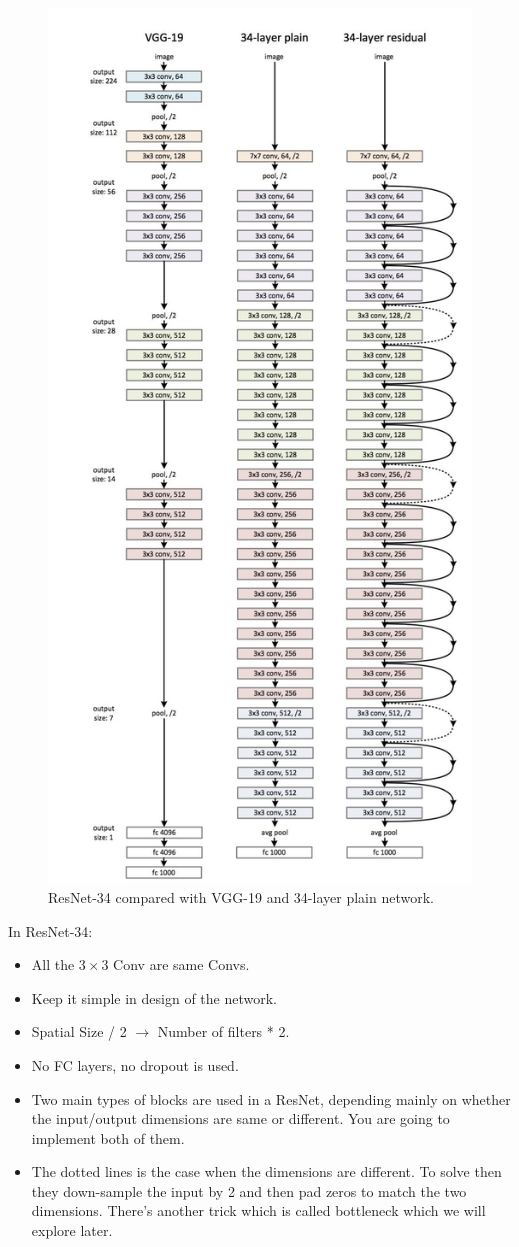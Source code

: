 \begin{figure}[!htbp]
    \centering
    \includegraphics[width=1.0\textwidth, height=1.3\textwidth]{img/c4/resnet-34.jpg}
    \caption{ResNet-34 compared with VGG-19 and 34-layer plain network.}
    \label{resnet-34}
\end{figure}

In ResNet-34:

\begin{itemize}
    \item All the $3\times 3$ Conv are same Convs.
    \item Keep it simple in design of the network.
    \item Spatial Size / 2 $\to$ Number of filters * 2.
    \item No FC layers, no dropout is used.
    \item Two main types of blocks are used in a ResNet, depending mainly on whether the input/output dimensions are same or different. You are going to implement both of them.
    \item The dotted lines is the case when the dimensions are different. To solve then they down-sample the input by 2 and then pad zeros to match the two dimensions. There's another trick which is called bottleneck which we will explore later.
\end{itemize}

